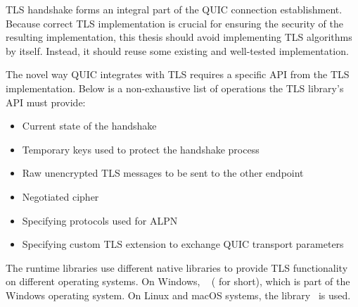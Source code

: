 TLS handshake forms an integral part of the QUIC connection establishment. Because correct TLS
implementation is crucial for ensuring the security of the resulting implementation, this thesis
should avoid implementing TLS algorithms by itself. Instead, it should reuse some existing and
well-tested implementation.

The novel way QUIC integrates with TLS requires a specific API from the TLS implementation. Below is
a non-exhaustive list of operations the TLS library's API must provide:

\begin{itemize}

  \item Current state of the handshake

  \item Temporary keys used to protect the handshake process

  \item Raw unencrypted TLS messages to be sent to the other endpoint

  \item Negotiated cipher

  \item Specifying protocols used for ALPN

  \item Specifying custom TLS extension to exchange QUIC transport parameters

\end{itemize}

The \dotnet{} runtime libraries use different native libraries to provide TLS functionality on
different operating systems. On Windows, ~\cite{Schannel} (\libschannel{}
for short), which is part of the Windows operating system. On Linux and macOS systems, the
\libopenssl{} library~\cite{OpenSSLWeb} is used.

